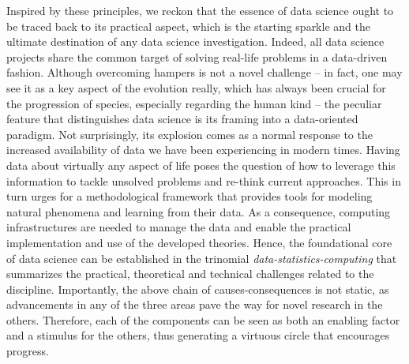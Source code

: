 Inspired by these principles, we reckon that the essence of data science ought to be traced back to its practical aspect, which is the starting sparkle and the ultimate destination of any data science investigation.
Indeed, all data science projects share the common target of solving real-life problems in a data-driven fashion.
Although overcoming hampers is not a novel challenge -- in fact, one may see it as a key aspect of the evolution really, which has always been crucial for the progression of species, especially regarding the human kind -- the peculiar feature that distinguishes data science is its framing into a data-oriented paradigm.
Not surprisingly, its explosion comes as a normal response to the increased availability of data we have been experiencing in modern times.
Having data about virtually any aspect of life poses the question of how to leverage this information to tackle unsolved problems and re-think current approaches.
This in turn urges for a methodological framework that provides tools for modeling natural phenomena and learning from their data.
As a consequence, computing infrastructures are needed to manage the data and enable the practical implementation and use of the developed theories.
Hence, the foundational core of data science can be established in the trinomial \textit{\mbox{data-statistics-computing}} that summarizes the practical, theoretical and technical challenges related to the discipline.
Importantly, the above chain of causes-consequences is not static, as advancements in any of the three areas pave the way for novel research in the others. 
Therefore, each of the components can be seen as both an enabling factor and a stimulus for the others, thus generating a virtuous circle that encourages progress.

